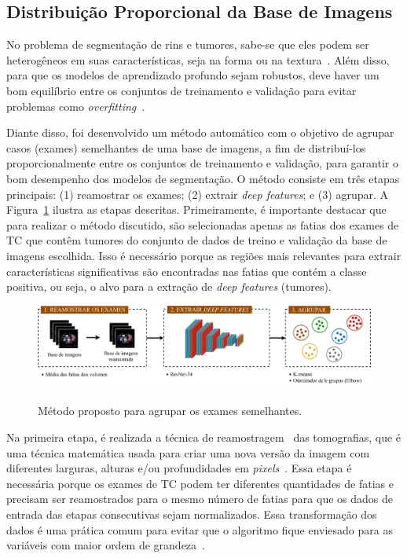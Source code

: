 \subsection{Distribuição Proporcional da Base de Imagens}
\label{sec:distribuicao-proporcional-dataset}

No problema de segmentação de rins e tumores, sabe-se que eles podem ser heterogêneos em suas características, seja na forma ou na textura~\cite{Sun2015}. Além disso, para que os modelos de aprendizado profundo sejam robustos, deve haver um bom equilíbrio entre os conjuntos de treinamento e validação para evitar problemas como \textit{overfitting}~\cite{johnson2019survey}.

Diante disso, foi desenvolvido um método automático com o objetivo de agrupar casos (exames) semelhantes de uma base de imagens, a fim de distribuí-los proporcionalmente entre os conjuntos de treinamento e validação, para garantir o bom desempenho dos modelos de segmentação. O método consiste em três etapas principais: (1) reamostrar os exames; (2) extrair \textit{deep features}; e (3) agrupar. A Figura~\ref{fig:metodo-agrupar} ilustra as etapas descritas. Primeiramente, é importante destacar que para realizar o método discutido, são selecionadas apenas as fatias dos exames de TC que contêm tumores do conjunto de dados de treino e validação da base de imagens escolhida. Isso é necessário porque as regiões mais relevantes para extrair características significativas são encontradas nas fatias que contém a classe positiva, ou seja, o alvo para a extração de \textit{deep features} (tumores).

\begin{figure}[!ht]
    \centering
    \caption{Método proposto para agrupar os exames semelhantes.}
    \includegraphics[width=1\textwidth]{figuras/distribuicao-proporcional-automatica.pdf}
    \label{fig:metodo-agrupar}
\end{figure}

Na primeira etapa, é realizada a técnica de reamostragem~\cite{dodgson1992image, 1372173} das tomografias, que é uma técnica matemática usada para criar uma nova versão da imagem com diferentes larguras, alturas e/ou profundidades em \textit{pixels}~\cite{dodgson1992image,sachs2001image}. Essa etapa é necessária porque os exames de TC podem ter diferentes quantidades de fatias e precisam ser reamostrados para o mesmo número de fatias para que os dados de entrada das etapas consecutivas sejam normalizados. Essa transformação dos dados é uma prática comum para evitar que o algoritmo fique enviesado para as variáveis com maior ordem de grandeza~\cite{kimble2015big}.


